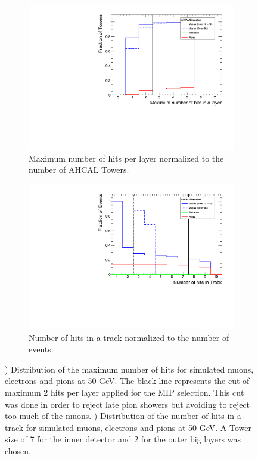 \begin{figure}[htbp!]
	\begin{subfigure}[t]{0.5\textwidth}
		\centering
		\includegraphics[width=1\linewidth]{chap5/fig_AHCAL_timing/Muons/TrackFinderCut_nHitsLayer_Muons}
		\caption{Maximum number of hits per layer normalized to the number of AHCAL Towers.} \label{fig:Muons_Track_nHitsLayer}
	\end{subfigure}
	\hfill
	\begin{subfigure}[t]{0.5\textwidth}
		\centering
		\includegraphics[width=1\linewidth]{chap5/fig_AHCAL_timing/Muons/TrackFinderCut_nHitsTrack_Muons}
		\caption{Number of hits in a track normalized to the number of events.} \label{fig:Muons_Track_nHits}
	\end{subfigure}
	\caption{) Distribution of the maximum number of hits for simulated muons, electrons and pions at 50 GeV. The black line represents the cut of maximum 2 hits per layer applied for the MIP selection. This cut was done in order to reject late pion showers but avoiding to reject too much of the muons. ) Distribution of the number of hits in a track for simulated muons, electrons and pions at 50 GeV. A Tower size of 7 for the inner detector and 2 for the outer big layers was chosen.}
\end{figure}

